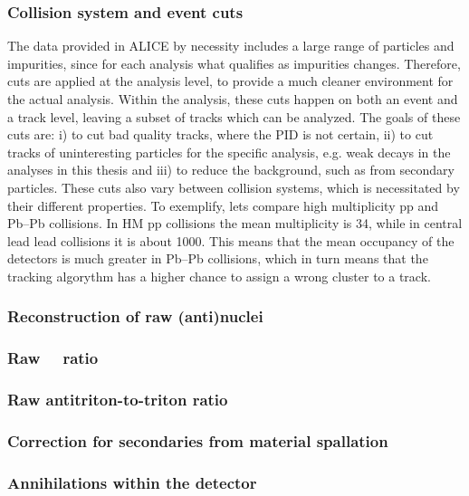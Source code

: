 \subsubsection{Collision system and event cuts}
The data provided in ALICE by necessity includes a large range of particles and impurities, since for each analysis what qualifies as impurities changes. Therefore, cuts are applied at the analysis level, to provide a much cleaner environment for the actual analysis. Within the analysis, these cuts happen on both an event and a track level, leaving a subset of tracks which can be analyzed. The goals of these cuts are: i) to cut bad quality tracks, where the PID is not certain, ii) to cut tracks of uninteresting particles for the specific analysis, e.g. weak decays in the analyses in this thesis and iii) to reduce the background, such as from secondary particles. These cuts also vary between collision systems, which is necessitated by their different properties. To exemplify, lets compare high multiplicity pp and Pb--Pb collisions. In HM pp collisions the mean multiplicity is 34, while in central lead lead collisions it is about 1000. This means that the mean occupancy of the detectors is much greater in Pb--Pb collisions, which in turn means that the tracking algorythm has a higher chance to assign a wrong cluster to a track. \\


\subsubsection{Reconstruction of raw (anti)nuclei}
\subsubsection{Raw \ratio\ \ ratio}
\subsubsection{Raw antitriton-to-triton ratio}
\subsubsection{Correction for secondaries from material spallation}
\subsubsection{Annihilations within the detector}


